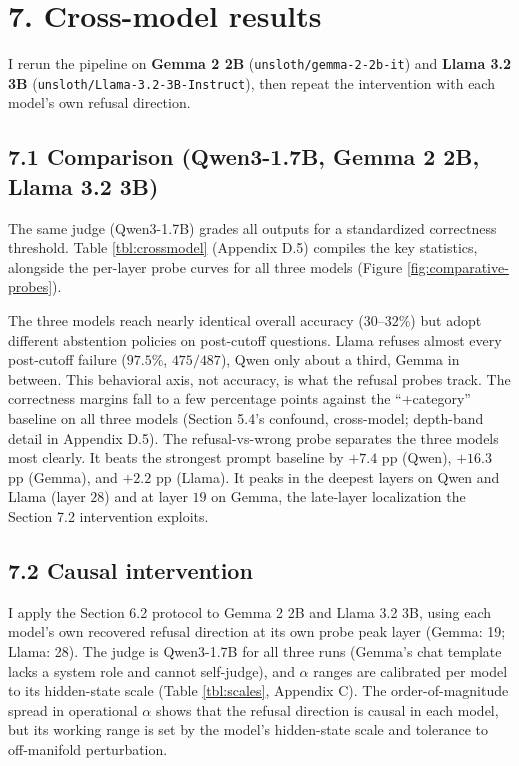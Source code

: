 \section{7. Cross-model results}\label{cross-model-results}

I rerun the pipeline on \textbf{Gemma 2 2B}
(\texttt{unsloth/gemma-2-2b-it}) and \textbf{Llama 3.2 3B}
(\texttt{unsloth/Llama-3.2-3B-Instruct}), then repeat the
intervention with each model's own refusal direction.

\subsection{7.1 Comparison (Qwen3-1.7B, Gemma 2 2B, Llama 3.2
3B)}\label{comparison-qwen3-1.7b-gemma-2-2b-llama-3.2-3b}

The same judge (Qwen3-1.7B) grades all outputs for a standardized
correctness threshold. Table \ref{tbl:crossmodel} (Appendix D.5)
compiles the key statistics, alongside the per-layer probe curves for
all three models (Figure \ref{fig:comparative-probes}).

The three models reach nearly identical overall accuracy
(\(30\)--\(32\%\)) but adopt different abstention policies on
post-cutoff questions. Llama refuses almost every post-cutoff failure
(\(97.5\%\), \(475/487\)), Qwen only about a third, Gemma in between.
This behavioral axis, not accuracy, is what the refusal probes track.
The correctness margins fall to a few percentage points against the
``+category'' baseline on all three models (Section 5.4's confound,
cross-model; depth-band detail in Appendix D.5). The refusal-vs-wrong probe separates the three models most clearly. It beats
the strongest prompt baseline by \(+7.4\) pp (Qwen), \(+16.3\) pp
(Gemma), and \(+2.2\) pp (Llama). It peaks in the deepest layers on Qwen
and Llama (layer \(28\)) and at layer \(19\) on Gemma, the late-layer
localization the Section 7.2 intervention exploits.


\subsection{7.2 Causal intervention}\label{causal-intervention}

I apply the Section 6.2 protocol to Gemma 2 2B and Llama 3.2 3B, using
each model's own recovered refusal direction at its own probe peak layer
(Gemma: 19; Llama: 28). The judge is Qwen3-1.7B for all three runs
(Gemma's chat template lacks a system role and cannot self-judge), and
\(\alpha\) ranges are calibrated per model to its hidden-state scale
(Table \ref{tbl:scales}, Appendix C). The order-of-magnitude spread in
operational \(\alpha\) shows that the refusal direction is causal in each model, but its working range is set by the model's
hidden-state scale and tolerance to off-manifold perturbation.

